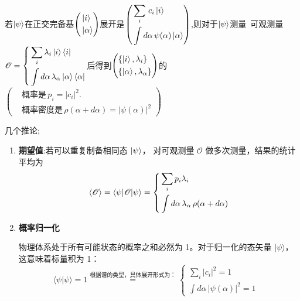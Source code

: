 \begin{postulate}[测量]
若$\ket{\psi}$在正交完备基$\left(\begin{aligned}
        &\ket{i}\\&\ket{\alpha}
    \end{aligned}\right)$展开是$\left(\begin{aligned}
        &\sum_{i}\,c_i \ket{i}\\&\int d\alpha\,\psi(\alpha)\ket{\alpha}
    \end{aligned}\right)$,则对于$\ket{\psi}$测量\, 可观测量$\mathscr{O}=
            \left\{\begin{aligned}
            &\sum_{i} \lambda_i\ket{i}\bra{i}\\
            &\int d\alpha\,\lambda_\alpha\ket{\alpha}\bra{\alpha}
            \end{aligned}\right.$后得到$\left(\begin{aligned}
        &\{\ket{i},\lambda_i\}\\ &\{\ket{\alpha},\lambda_\alpha\}
    \end{aligned}\right)$的$\left(
        \begin{aligned}
        &\text{概率是}\,p_i = |c_i|^2.\\
        &\text{概率密度是}\,\rho(\alpha+d\alpha)=|\psi(\alpha)|^2
        \end{aligned}
    \right)$

几个推论;\begin{enumerate}
    \item \textbf{期望值}:若可以重复制备相同态 $\ket{\psi}$，
        对可观测量 $\mathscr{O}$ 做多次测量，结果的统计平均为
        \begin{equation}
            \braket{\mathscr{O}}=\braket{\psi|\mathscr{O}|\psi}=\left\{\begin{aligned}
            &\sum_i p_i \lambda_i\\
            &\int d\alpha\, \lambda_\alpha\, \rho(\alpha+d\alpha)
        \end{aligned}\right.
        \end{equation}
    \item \textbf{概率归一化}
    
    物理体系处于所有可能状态的概率之和必然为 1。对于归一化的态矢量 $|\psi\rangle$，这意味着标量积为 1：
    \begin{equation}
        \langle \psi | \psi \rangle = 1\overset{ 根据谱的类型，具体展开形式为：}{=}      \begin{cases}
            \displaystyle \sum_i |c_i|^2 = 1 &  \\
            \displaystyle \int d\alpha \, |\psi(\alpha)|^2 = 1 & 
        \end{cases}
    \end{equation}


\end{enumerate}
\end{postulate}
